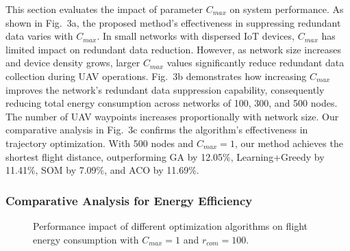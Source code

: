 \documentclass[sigconf]{acmart}
\begin{document}
This section evaluates the impact of parameter $C_{max}$ on system performance. As shown in Fig.~3a, the proposed method's effectiveness in suppressing redundant data varies with $C_{max}$. In small networks with dispersed IoT devices, $C_{max}$ has limited impact on redundant data reduction. However, as network size increases and device density grows, larger $C_{max}$ values significantly reduce redundant data collection during UAV operations. Fig.~3b demonstrates how increasing $C_{max}$ improves the network's redundant data suppression capability, consequently reducing total energy consumption across networks of 100, 300, and 500 nodes. The number of UAV waypoints increases proportionally with network size. Our comparative analysis in Fig.~3c confirms the algorithm's effectiveness in trajectory optimization. With 500 nodes and $C_{max}=1$, our method achieves the shortest flight distance, outperforming GA by 12.05\%, Learning+Greedy by 11.41\%, SOM by 7.09\%, and ACO by 11.69\%. %





\subsubsection{Comparative Analysis for Energy Efficiency}

\begin{figure}[htbp]
	\centering
	\hfill
    \caption{Performance impact of different optimization algorithms on flight energy consumption with $C_{max}=1$ and $r_{com} =100$.}
	\label{location} %
\end{figure}
\end{document}
